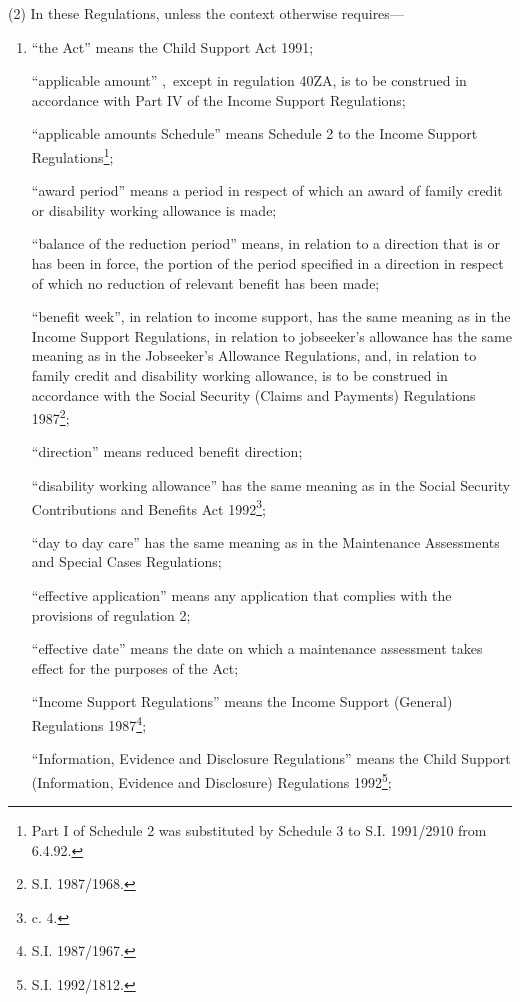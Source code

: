 \documentclass[a4paper]{article}
\begin{document}
(2) In these Regulations, unless the context otherwise requires—
\begin{enumerate}\item[]
“the Act” means the Child Support Act 1991;

“applicable amount”%
,~except in regulation 40ZA,  %
 is to be construed in accordance with Part IV of the Income Support Regulations;

“applicable amounts Schedule” means Schedule 2 to the Income Support Regulations\footnote{\frenchspacing Part I of Schedule 2 was substituted by Schedule 3 to S.I. 1991/2910 from 6.4.92.};

“award period” means a period in respect of which an award of family credit or disability working allowance is made;

“balance of the reduction period” means, in relation to a direction that is or has been in force, the portion of the period specified in a direction in respect of which no reduction of relevant benefit has been made;

“benefit week”, in relation to income support, has the same meaning as in the Income Support Regulations, 
in relation to jobseeker’s allowance has the same meaning as in the Jobseeker’s Allowance Regulations,  %
and, in relation to family credit and disability working allowance, is to be construed in accordance with the Social Security (Claims and Payments) Regulations 1987\footnote{\frenchspacing S.I. 1987/1968.};

“direction” means reduced benefit direction;

“disability working allowance” has the same meaning as in the Social Security Contributions and Benefits Act 1992\footnote{ c. 4.};

“day to day care” has the same meaning as in the Maintenance Assessments and Special Cases Regulations;

“effective application” means any application that complies with the provisions of regulation 2;

“effective date” means the date on which a maintenance assessment takes effect for the purposes of the Act;

“Income Support Regulations” means the Income Support (General) Regulations 1987\footnote{\frenchspacing S.I. 1987/1967.};

“Information, Evidence and Disclosure Regulations” means the Child Support (Information, Evidence and Disclosure) Regulations 1992\footnote{\frenchspacing S.I. 1992/1812.};


\end{enumerate}
\end{document}
